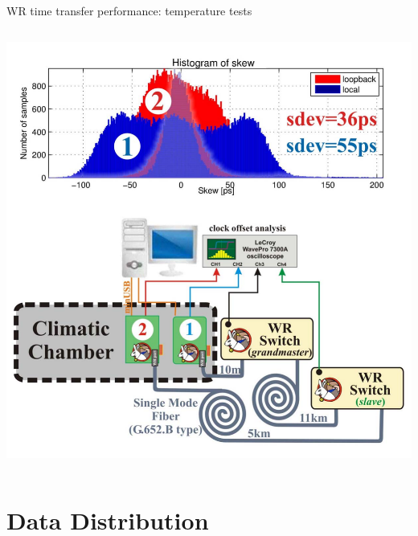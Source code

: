 \documentclass[compress,red]{beamer}
\begin{document}
\begin{frame}{WR time transfer performance: temperature tests}
\begin{columns}[c]
		\hspace{-0.8cm}
		\begin{center}
		\includegraphics[width=1.13\textwidth]{measurements/tempTests-2-combo.pdf}
		\end{center}


  \end{columns} 
\end{frame}
\section{Data Distribution}
\end{document}
